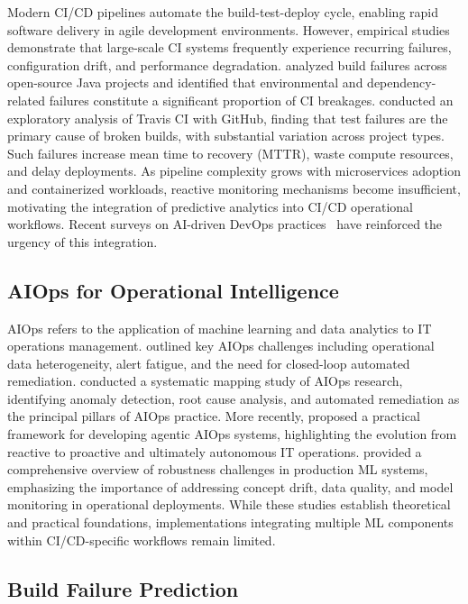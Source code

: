 \documentclass[a4paper,fleqn]{cas-dc}
\begin{document}
Modern CI/CD pipelines automate the build-test-deploy cycle, enabling rapid software delivery in agile development environments.
However, empirical studies demonstrate that large-scale CI systems frequently experience recurring failures, configuration drift, and performance degradation.
\citet{rausch2017empirical} analyzed build failures across open-source Java projects and identified that environmental and dependency-related failures constitute a significant proportion of CI breakages.
\citet{beller2017oops} conducted an exploratory analysis of Travis CI with GitHub, finding that test failures are the primary cause of broken builds, with substantial variation across project types.
Such failures increase mean time to recovery (MTTR), waste compute resources, and delay deployments.
As pipeline complexity grows with microservices adoption and containerized workloads, reactive monitoring mechanisms become insufficient, motivating the integration of predictive analytics into CI/CD operational workflows.
Recent surveys on AI-driven DevOps practices~\citep{kanahols2025timeseries} have reinforced the urgency of this integration.

\subsection{AIOps for Operational Intelligence}\label{subsec:aiops}

AIOps refers to the application of machine learning and data analytics to IT operations management.
\citet{dang2019aiops} outlined key AIOps challenges including operational data heterogeneity, alert fatigue, and the need for closed-loop automated remediation.
\citet{notaro2021aiops} conducted a systematic mapping study of AIOps research, identifying anomaly detection, root cause analysis, and automated remediation as the principal pillars of AIOps practice.
More recently, \citet{zota2025agentic} proposed a practical framework for developing agentic AIOps systems, highlighting the evolution from reactive to proactive and ultimately autonomous IT operations.
\citet{bayram2025trustworthy} provided a comprehensive overview of robustness challenges in production ML systems, emphasizing the importance of addressing concept drift, data quality, and model monitoring in operational deployments.
While these studies establish theoretical and practical foundations, implementations integrating multiple ML components within CI/CD-specific workflows remain limited.

\subsection{Build Failure Prediction}\label{subsec:failure}
\end{document}
